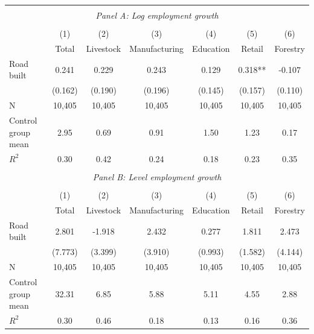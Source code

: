 \begin{tabular}{l*{6}{c}} \hline
\hline \\ \multicolumn{7}{c}{\textit{Panel A: Log employment growth}} \\\\ [-1ex] \hline           &\multicolumn{1}{c}{(1)} & \multicolumn{1}{c}{(2)} &\multicolumn{1}{c}{(3)}          &\multicolumn{1}{c}{(4)} &\multicolumn{1}{c}{(5)} &\multicolumn{1}{c}{(6)} \\          &\multicolumn{1}{c}{Total} & \multicolumn{1}{c}{Livestock} &\multicolumn{1}{c}{Manufacturing}          &\multicolumn{1}{c}{Education} &\multicolumn{1}{c}{Retail} &\multicolumn{1}{c}{Forestry} \\ \hline
Road built               &       0.241   &       0.229   &       0.243   &       0.129   &       0.318** &      -0.107   \\
                         &     (0.162)   &     (0.190)   &     (0.196)   &     (0.145)   &     (0.157)   &     (0.110)   \\
\hline
N                        &      10,405   &      10,405   &      10,405   &      10,405   &      10,405   &      10,405   \\
Control group mean       &        2.95   &        0.69   &        0.91   &        1.50   &        1.23   &        0.17   \\
$ R^{2} $                &        0.30   &        0.42   &        0.24   &        0.18   &        0.23   &        0.35   \\
\hline \\ \multicolumn{7}{c}{\textit{Panel B: Level employment growth}} \\\\ [-1ex] \hline                   &\multicolumn{1}{c}{(1)} & \multicolumn{1}{c}{(2)} &\multicolumn{1}{c}{(3)}          &\multicolumn{1}{c}{(4)} &\multicolumn{1}{c}{(5)} &\multicolumn{1}{c}{(6)} \\          &\multicolumn{1}{c}{Total} & \multicolumn{1}{c}{Livestock} &\multicolumn{1}{c}{Manufacturing}          &\multicolumn{1}{c}{Education} &\multicolumn{1}{c}{Retail} &\multicolumn{1}{c}{Forestry} \\ \hline
Road built               &       2.801   &      -1.918   &       2.432   &       0.277   &       1.811   &       2.473   \\
                         &     (7.773)   &     (3.399)   &     (3.910)   &     (0.993)   &     (1.582)   &     (4.144)   \\
\hline
N                        &      10,405   &      10,405   &      10,405   &      10,405   &      10,405   &      10,405   \\
Control group mean       &       32.31   &        6.85   &        5.88   &        5.11   &        4.55   &        2.88   \\
$ R^{2} $                &        0.30   &        0.46   &        0.18   &        0.13   &        0.16   &        0.36   \\
\hline\hline \end{tabular}
